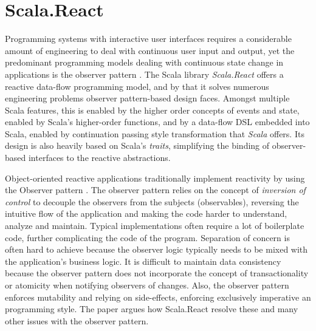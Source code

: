 



\section{Scala.React}\label{sec:theory_scala-react}

Programming systems with interactive user interfaces requires a considerable amount of engineering to deal with continuous user input and output, yet the predominant programming models dealing with continuous state change in applications is the observer pattern \cite{Gamma:1995:DPE:186897}. The Scala library \emph{Scala.React} offers a reactive data-flow programming model, and by that it solves numerous engineering problems observer pattern-based design faces. Amongst multiple Scala features, this is enabled by the higher order concepts of events and state, enabled by Scala's higher-order functions, and by a data-flow DSL embedded into Scala, enabled by continuation passing style transformation that \emph{Scala} offers. Its design is also heavily based on Scala's \emph{traits}, simplifying the binding of observer-based interfaces to the reactive abstractions.\cite{EPFL-REPORT-176887}

Object-oriented reactive applications traditionally implement reactivity by using the Observer pattern  \cite{EPFL-REPORT-176887}\cite{rescala:2014}. The observer pattern relies on the concept of \emph{inversion of control} to decouple the observers from the subjects (observables), reversing the intuitive flow of the application and making the code harder to understand, analyze and maintain. Typical implementations often require a lot of boilerplate code, further complicating the code of the program. Separation of concern is often hard to achieve because the observer logic typically needs to be mixed with the application's business logic. It is difficult to maintain data consistency because the observer pattern does not incorporate the concept of transactionality or atomicity when notifying observers of changes. Also, the observer pattern enforces mutability and relying on side-effects, enforcing exclusively imperative an programming style. The paper \cite{EPFL-REPORT-176887} argues how Scala.React resolve these and many other issues with the observer pattern.

